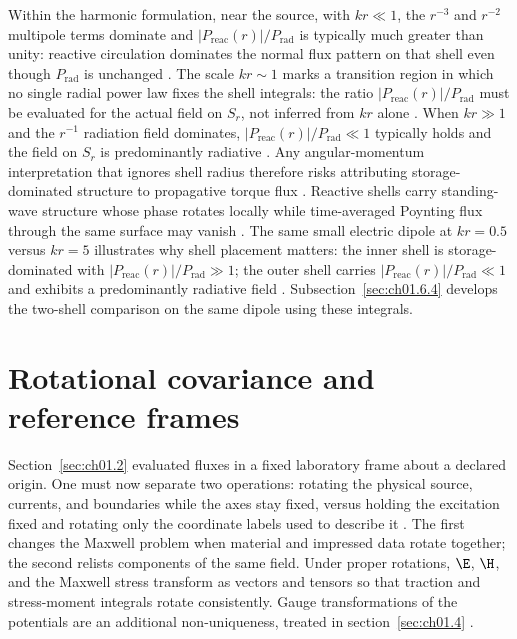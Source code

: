 Within the harmonic formulation, near the source, with \(kr\ll 1\), the \(r^{-3}\) and \(r^{-2}\) multipole terms dominate and \(|P_{\mathrm{reac}}(r)|/P_{\mathrm{rad}}\) is typically much greater than unity: reactive circulation dominates the normal flux pattern on that shell even though \(P_{\mathrm{rad}}\) is unchanged \cite{stratton1941}. The scale \(kr\sim 1\) marks a transition region in which no single radial power law fixes the shell integrals: the ratio \(|P_{\mathrm{reac}}(r)|/P_{\mathrm{rad}}\) must be evaluated for the actual field on \(S_r\), not inferred from \(kr\) alone \cite{stratton1941}. When \(kr\gg 1\) and the \(r^{-1}\) radiation field dominates, \(|P_{\mathrm{reac}}(r)|/P_{\mathrm{rad}}\ll 1\) typically holds and the field on \(S_r\) is predominantly radiative \cite{poynting1884,stratton1941}. Any angular-momentum interpretation that ignores shell radius therefore risks
attributing storage-dominated structure to propagative torque flux
\cite{stratton1941}. Reactive shells carry standing-wave structure whose phase rotates
locally while time-averaged Poynting flux through the same surface may vanish
\cite{stratton1941}. The same small electric dipole at $kr=0.5$ versus $kr=5$ illustrates why
shell placement matters: the inner shell is storage-dominated with \(|P_{\mathrm{reac}}(r)|/P_{\mathrm{rad}}\gg 1\); the outer shell carries \(|P_{\mathrm{reac}}(r)|/P_{\mathrm{rad}}\ll 1\) and exhibits a predominantly radiative field \cite{harrington2001}. Subsection~\ref{sec:ch01.6.4} develops the two-shell comparison on the same dipole using these integrals.

\section{Rotational covariance and reference frames}
\label{sec:ch01.3}

Section~\ref{sec:ch01.2} evaluated fluxes in a fixed laboratory frame about a declared origin. One must now separate two operations: rotating the physical source, currents, and boundaries while the axes stay fixed, versus holding the excitation fixed and rotating only the coordinate labels used to describe it \cite{stratton1941,hansen1988}. The first changes the Maxwell problem when material and impressed data rotate together; the second relists components of the same field. Under proper rotations, $\E$, $\H$, and the Maxwell stress transform as vectors and tensors so that traction and stress-moment integrals rotate consistently. Gauge transformations of the potentials are an additional non-uniqueness, treated in section~\ref{sec:ch01.4} \cite{belinfante1940,maxwell1873}.


